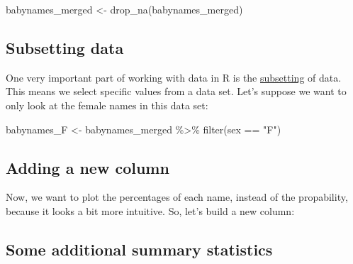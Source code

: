 \documentclass[
  letterpaper,
  DIV=11,
  numbers=noendperiod]{scrartcl}
\newenvironment{Shaded}{\begin{snugshade}}{\end{snugshade}}
\newcommand{\DecValTok}[1]{\textcolor[rgb]{0.68,0.00,0.00}{#1}}
\newcommand{\FunctionTok}[1]{\textcolor[rgb]{0.28,0.35,0.67}{#1}}
\newcommand{\NormalTok}[1]{\textcolor[rgb]{0.00,0.23,0.31}{#1}}
\newcommand{\OtherTok}[1]{\textcolor[rgb]{0.00,0.23,0.31}{#1}}
\newcommand{\SpecialCharTok}[1]{\textcolor[rgb]{0.37,0.37,0.37}{#1}}
\newcommand{\StringTok}[1]{\textcolor[rgb]{0.13,0.47,0.30}{#1}}
\begin{document}
\begin{Shaded}
\begin{Highlighting}[]
\NormalTok{babynames\_merged }\OtherTok{\textless{}{-}} \FunctionTok{drop\_na}\NormalTok{(babynames\_merged)}
\end{Highlighting}
\end{Shaded}

\hypertarget{subsetting-data}{%
\subsection{Subsetting data}\label{subsetting-data}}

One very important part of working with data in R is the
\href{subsetting.qmd}{subsetting} of data. This means we select specific
values from a data set. Let's suppose we want to only look at the female
names in this data set:

\begin{Shaded}
\begin{Highlighting}[]
\NormalTok{babynames\_F }\OtherTok{\textless{}{-}}\NormalTok{ babynames\_merged }\SpecialCharTok{\%\textgreater{}\%}
  \FunctionTok{filter}\NormalTok{(sex }\SpecialCharTok{==} \StringTok{"F"}\NormalTok{)}
\end{Highlighting}
\end{Shaded}

\hypertarget{adding-a-new-column}{%
\subsection{Adding a new column}\label{adding-a-new-column}}

Now, we want to plot the percentages of each name, instead of the
propability, because it looks a bit more intuitive. So, let's build a
new column:

\begin{Shaded}
\end{Shaded}

\hypertarget{some-additional-summary-statistics}{%
\subsection{Some additional summary
statistics}\label{some-additional-summary-statistics}}
\end{document}
